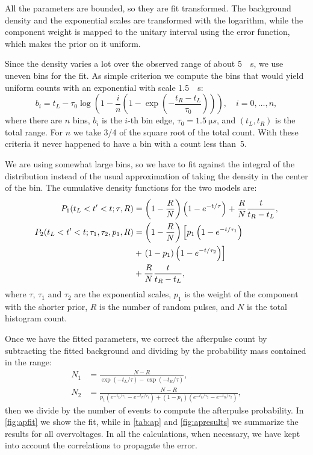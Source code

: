 All the parameters are bounded, so they are fit transformed. The background
density and the exponential scales are transformed with the logarithm, while
the component weight is mapped to the unitary interval using the error
function, which makes the prior on it uniform.

Since the density varies a lot over the observed range of about \SI{5}{\micro
s}, we use uneven bins for the fit. As simple criterion we compute the bins
that would yield uniform counts with an exponential with scale \SI{1.5}{\micro
s}:
%
\begin{equation}
    b_i = t_L - \tau_0 \log\left(1 - \frac in
    \left(1 - \exp\left(-\frac{t_R - t_L}{\tau_0}\right)\right)\right),
    \quad i = 0, \ldots, n,
\end{equation}
%
where there are $n$ bins, $b_i$ is the $i$-th bin edge, $\tau_0 =
\SI{1.5}{\micro s}$, and $(t_L, t_R)$ is the total range. For $n$ we take 3/4
of the square root of the total count. With these criteria it never happened
to have a bin with a count less than~5.

We are using somewhat large bins, so we have to fit against the integral of the
distribution instead of the usual approximation of taking the density in the
center of the bin. The cumulative density functions for the two models are:
%
\begin{align}
    P_1(t_L < t' < t;\tau,R) &=
    \left(1-\frac RN\right)
    \left(1 - e^{-t/\tau}\right)
    + \frac RN \frac t{t_R-t_L}, \\
    P_2(t_L < t' < t;\tau_1,\tau_2,p_1,R) &=
    \left(1-\frac RN\right)
    \left[p_1 \left(1 - e^{-t/\tau_1}\right)\right. \notag \\
    \phantom x &+ \left.(1 - p_1)
    \left(1 - e^{-t/\tau_2}\right) \right] \notag \\
    \phantom x &+ \frac RN \frac t{t_R-t_L},
\end{align}
%
where $\tau$, $\tau_1$ and $\tau_2$ are the exponential scales, $p_1$ is
the weight of the component with the shorter prior, $R$ is the number of
random pulses, and $N$ is the total histogram count.

Once we have the fitted parameters, we correct the afterpulse count by
subtracting the fitted background and dividing by the probability mass
contained in the range:
%
\begin{align}
    N_1 &= \frac {N-R} {\exp(-t_L/\tau) - \exp(-t_R/\tau)},
    \label{eq:n1} \\
    N_2 &= \frac {N-R} {p_1 (e^{-t_L/\tau_1} - e^{-t_R/\tau_1})
    + (1-p_1) (e^{-t_L/\tau_2} - e^{-t_R/\tau_2})},
    \label{eq:n2}
\end{align}
%
then we divide by the number of events to compute the afterpulse probability.
In \autoref{fig:apfit} we show the fit, while in \autoref{tab:ap} and
\autoref{fig:apresults} we summarize the results for all overvoltages. In all
the calculations, when necessary, we have kept into account the correlations to
propagate the error.

